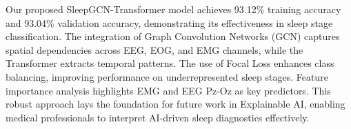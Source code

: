 

Our proposed SleepGCN-Transformer model achieves 93.12\% training accuracy and
93.04\% validation accuracy, demonstrating its effectiveness in sleep stage classification.
The integration of Graph Convolution Networks (GCN) captures spatial dependencies
across EEG, EOG, and EMG channels, while the Transformer extracts temporal patterns. The
use of Focal Loss enhances class balancing, improving performance on underrepresented sleep
stages. Feature importance analysis highlights EMG and EEG Pz-Oz as key predictors. This
robust approach lays the foundation for future work in Explainable AI, enabling medical
professionals to interpret AI-driven sleep diagnostics effectively.